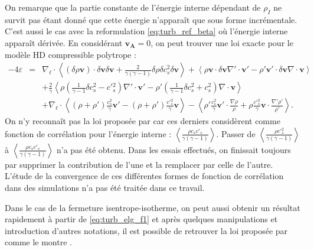 On remarque que la partie constante de l'énergie interne dépendant de $\rho_I$ ne survit pas étant donné que cette énergie n'apparaît que sous forme incrémentale. C'est aussi le cas avec la reformulation \eqref{eq:turb_ref_beta} où l'énergie interne apparaît dérivée. En considérant $\boldsymbol{v_A} = 0$, on peut trouver une loi exacte pour le modèle \ac{HD} compressible polytrope :  
\begin{eqnarray}
-4\varepsilon &=& \nabla_{\boldsymbol{\ell}} \cdot \left<\left(\delta \rho\boldsymbol{v}\right) \cdot \delta \boldsymbol{v}\delta \boldsymbol{v} + \frac{2}{\gamma\left(\gamma-1\right)} \delta \rho  \delta c^2_s \delta \boldsymbol{v}\right> +\left< \rho \boldsymbol{v} \cdot \delta \boldsymbol{v}  \nabla' \cdot \boldsymbol{v'} - \rho' \boldsymbol{v'} \cdot \delta \boldsymbol{v} \nabla \cdot \boldsymbol{v}\right>\nonumber\\
&&+   \frac{2}{\gamma} \left<\rho \left(\frac{1}{\gamma-1} \delta c^2_s - c'{}^2_s\right)\nabla' \cdot \boldsymbol{v'}  - \rho' \left(\frac{1}{\gamma-1}\delta c^2_s + c^2_s\right) \nabla \cdot \boldsymbol{v} \right>\\
&&+  \nabla_{\boldsymbol{\ell}} \cdot \left< \left(\rho+\rho'\right) \frac{c^2_s}{\gamma} \boldsymbol{v'} -  \left(\rho+\rho'\right) \frac{c'{}^2_s}{\gamma}  \boldsymbol{v} \right> - \left<\rho' \frac{c^2_s}{\gamma}  \boldsymbol{v'} \cdot \frac{\nabla \rho}{\rho} + \rho \frac{c'{}^2_s}{\gamma} \boldsymbol{v} \cdot \frac{\nabla' \rho'}{\rho'} \right> .\nonumber
\end{eqnarray} 
On n'y reconnaît pas la loi proposée par \cite{banerjee_kolmogorov-like_2014} car ces derniers considèrent comme fonction de corrélation pour l'énergie interne : $\left<\frac{\rho c_s c'_s}{\gamma\left(\gamma-1\right)}\right>$. Passer de $\left<\frac{\rho c'{}^2_s }{\gamma\left(\gamma-1\right)}\right>$ à $\left<\frac{\rho c_s c'_s}{\gamma\left(\gamma-1\right)}\right>$ n'a pas été obtenu. Dans les essais effectués, on finissait toujours par supprimer la contribution de l'une et la remplacer par celle de l'autre. L'étude de la convergence de ces différentes formes de fonction de corrélation dans des simulations n'a pas été traitée dans ce travail.

Dans le cas de la fermeture isentrope-isotherme, on peut aussi obtenir un résultat rapidement à partir de \eqref{eq:turb_elg_f1} et après quelques manipulations et introduction d'autres notations, il est possible de retrouver la loi proposée par \cite{andres_alternative_2017} comme le montre \cite{simon_general_2021}.

